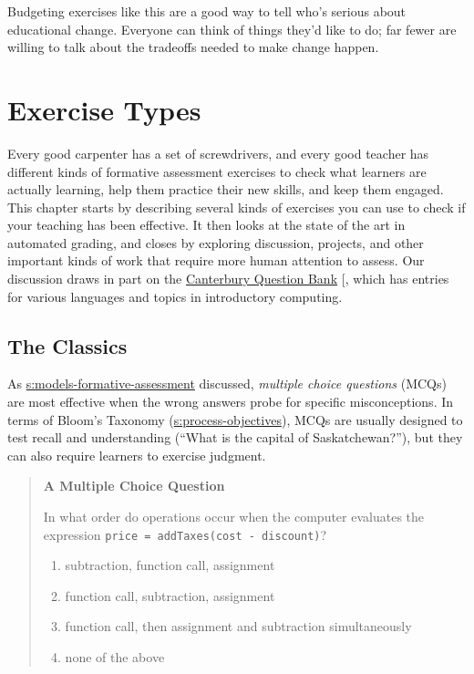 Budgeting exercises like this are a good way to tell who's serious about
educational change. Everyone can think of things they'd like to do; far
fewer are willing to talk about the tradeoffs needed to make change
happen.

\chapter{Exercise Types}\label{s:exercises}

Every good carpenter has a set of screwdrivers, and every good teacher
has different kinds of formative assessment exercises to check what
learners are actually learning, help them practice their new skills, and
keep them engaged. This chapter starts by describing several kinds of
exercises you can use to check if your teaching has been effective. It
then looks at the state of the art in automated grading, and closes by
exploring discussion, projects, and other important kinds of work that
require more human attention to assess. Our discussion draws in part on
the \href{http://web-cat.org/questionbank/}{Canterbury Question Bank}
{[}\protect[\hyperlink{b:Sand2013}{Sand2013}]{]}, which has entries for various languages and topics
in introductory computing.

\section{The Classics}\label{s:exercises-classics}

As \protect\hyperlink{SECTION}{s:models-formative-assessment} discussed, \emph{multiple
choice questions} (MCQs) are most effective when the wrong answers probe
for specific misconceptions. In terms of Bloom's Taxonomy
(\protect\hyperlink{SECTION}{s:process-objectives}), MCQs are usually designed to test
recall and understanding (``What is the capital of Saskatchewan?''), but
they can also require learners to exercise judgment.

\begin{quote}\setlength{\parindent}{0pt}
\textbf{A Multiple Choice Question}

In what order do operations occur when the computer evaluates the
expression \texttt{price\ =\ addTaxes(cost\ -\ discount)}?

\begin{enumerate}
\tightlist
\item
  subtraction, function call, assignment
\item
  function call, subtraction, assignment
\item
  function call, then assignment and subtraction simultaneously
\item
  none of the above
\end{enumerate}
\end{quote}

